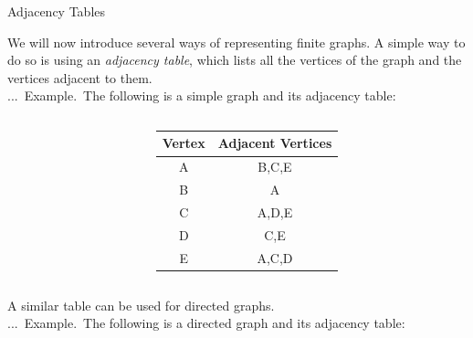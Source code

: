 \documentclass[smaller,hyperref={CJKbookmarks=true}]{beamer}
\newcounter{zhuo}[subsection]
\renewcommand{\thezhuo}{\thesection.\thesubsection.\arabic{zhuo}}
\newenvironment{EXAMPLE}{\stepcounter{zhuo}\alert{\!\thezhuo.~Example.\,}}{}
\begin{document}
\begin{frame}{Adjacency Tables}
\begin{spacing}{1.1}
We will now introduce several ways of representing finite graphs. A simple
way to do so is using an \emph{adjacency table}, which lists all the vertices of the
graph and the vertices adjacent to them.\\[6pt]
\begin{EXAMPLE}
The following is a simple graph and its adjacency table:\\[5pt]
\begin{columns}[onlytextwidth]
\begin{column}{0.5\textwidth}
\begin{center}
\end{center}
\end{column}
\begin{column}{0.5\textwidth}
\begin{tabular}{cc}
  \toprule
  Vertex & Adjacent Vertices \\ \midrule
  A & B,\:C,\:E \\
  B & A \\
  C & A,\:D,\:E \\
  D & C,\:E \\
  E & A,\:C,\:D \\
  \toprule
\end{tabular}
\end{column}
\end{columns}
\end{EXAMPLE}
\newpage
A similar table can be used for directed graphs.\\[6pt]
\begin{EXAMPLE}
The following is a directed graph and its adjacency table:\\[6pt]
\begin{columns}[onlytextwidth]
\begin{column}{0.5\textwidth}

\end{column}
\end{columns}
\end{EXAMPLE}
\end{spacing}
\end{frame}
\end{document}
